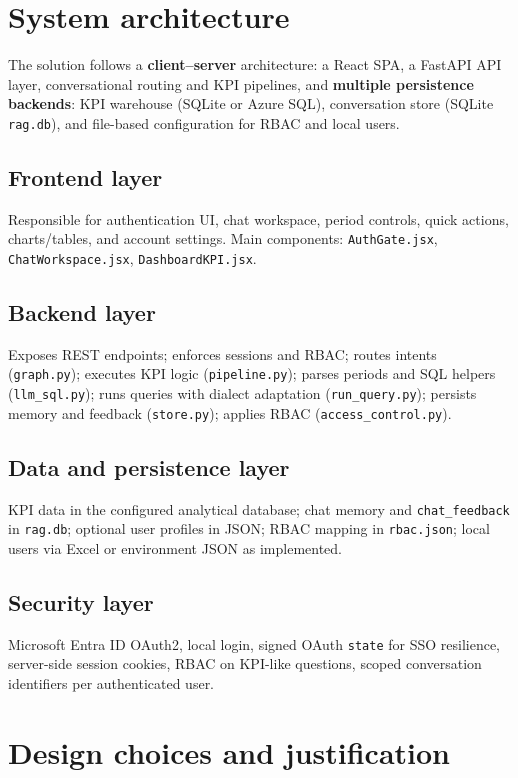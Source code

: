 \section{System architecture}
The solution follows a \textbf{client--server} architecture: a React SPA, a FastAPI API layer, conversational routing and KPI pipelines, and \textbf{multiple persistence backends}: KPI warehouse (SQLite or Azure SQL), conversation store (SQLite \texttt{rag.db}), and file-based configuration for RBAC and local users.

\subsection{Frontend layer}
Responsible for authentication UI, chat workspace, period controls, quick actions, charts/tables, and account settings. Main components: \texttt{AuthGate.jsx}, \texttt{ChatWorkspace.jsx}, \texttt{DashboardKPI.jsx}.

\subsection{Backend layer}
Exposes REST endpoints; enforces sessions and RBAC; routes intents (\texttt{graph.py}); executes KPI logic (\texttt{pipeline.py}); parses periods and SQL helpers (\texttt{llm\_sql.py}); runs queries with dialect adaptation (\texttt{run\_query.py}); persists memory and feedback (\texttt{store.py}); applies RBAC (\texttt{access\_control.py}).

\subsection{Data and persistence layer}
KPI data in the configured analytical database; chat memory and \texttt{chat\_feedback} in \texttt{rag.db}; optional user profiles in JSON; RBAC mapping in \texttt{rbac.json}; local users via Excel or environment JSON as implemented.

\subsection{Security layer}
Microsoft Entra ID OAuth2, local login, signed OAuth \texttt{state} for SSO resilience, server-side session cookies, RBAC on KPI-like questions, scoped conversation identifiers per authenticated user.

\section{Design choices and justification}
